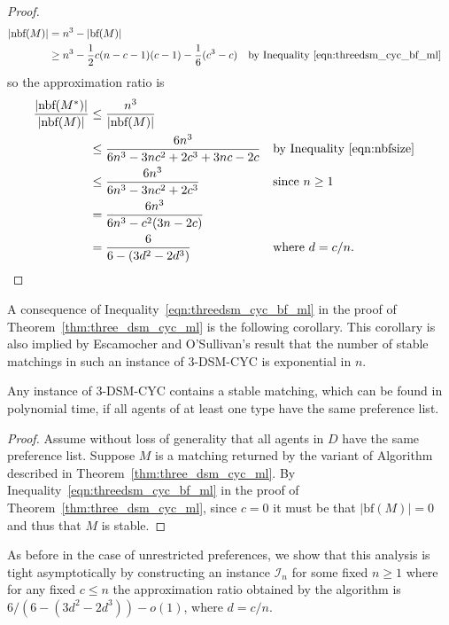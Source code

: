 \begin{proof}
\begin{align}
    |\text{nbf}(M)| &= n^3 - |\text{bf}(M)|\nonumber\\
    &\geq n^3 - \frac{1}{2}c(n - c - 1)(c - 1) - \frac{1}{6}(c^3 - c) && \label{eqn:nbfsize}\mbox{by Inequality~\ref{eqn:threedsm_cyc_bf_ml}}
\end{align}
so the approximation ratio is
\begin{align*}
    \frac{|\textrm{nbf}(M^*)|}{|\textrm{nbf}(M)|} &\leq \frac{n^3}{|\textrm{nbf}(M)|}\\
    &\leq \frac{6n^3}{6n^3 - 3nc^2  + 2c^3 + 3nc - 2c} && \mbox{by Inequality~\ref{eqn:nbfsize}}\\
    &\leq \frac{6n^3}{6n^3- 3nc^2 + 2c^3} && \mbox{since $n \geq 1$}\\
    &= \frac{6n^3}{6n^3 - c^2(3n - 2c)}\\
    &= \frac{6}{6 - (3d^2 - 2d^3)} && \mbox{where $d = c/n$.}
\end{align*}
\end{proof}

A consequence of Inequality~\ref{eqn:threedsm_cyc_bf_ml} in the proof of Theorem~\ref{thm:three_dsm_cyc_ml} is the following corollary. This corollary is also implied by Escamocher and O'Sullivan's \cite{Escamocher2018} result that the number of stable matchings in such an instance of 3-DSM-CYC is exponential in $n$.

\begin{cor}
\label{cor:three_dsm_cyc_ml_stab}
Any instance of 3-DSM-CYC contains a stable matching, which can be found in polynomial time, if all agents of at least one type have the same preference list.
\end{cor}
\begin{proof}
Assume without loss of generality that all agents in $D$ have the same preference list. Suppose $M$ is a matching returned by the variant of Algorithm~ described in Theorem~\ref{thm:three_dsm_cyc_ml}. By Inequality~\ref{eqn:threedsm_cyc_bf_ml} in the proof of Theorem~\ref{thm:three_dsm_cyc_ml}, since $c = 0$ it must be that $|\textrm{bf}(M)| = 0$ and thus that $M$ is stable.
\end{proof}

As before in the case of unrestricted preferences, we show that this analysis is tight asymptotically by constructing an instance $\mathcal{I}_n$ for some fixed $n \geq 1$ where for any fixed $c \leq n$ the approximation ratio obtained by the algorithm is $6 / (6 - (3d^2 - 2d^3)) - o(1)$, where $d = c/n$.

